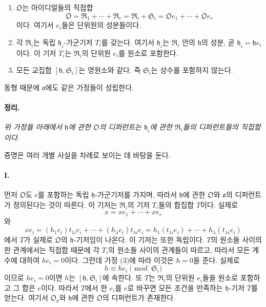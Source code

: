 \begin{enumerate}
\item[(1)] \(\mathfrak O\)는 아이디얼들의 직접합
\[
\mathfrak O=\mathfrak R_1+\cdots+\mathfrak R_r
=\mathfrak R_i+\mathfrak S_i
=\mathfrak Oe_1+\cdots+\mathfrak Oe_r
\]
이다. 여기서 \(e_i\)들은 단위원의 성분들이다.

\item[(2)] 각 \(\mathfrak R_i\)는 독립 \(\mathfrak h_i\)-가군기저 \(T_i\)를 갖는다. 여기서 \(\mathfrak h_i\)는 \(\mathfrak R_i\) 안의 \(\mathfrak h\)의 성분, 곧 \(\mathfrak h_i=\mathfrak h e_i\)이다. 이 기저 \(T_i\)는 \(\mathfrak R_i\)의 단위원 \(e_i\)를 원소로 포함한다.

\item[(3)] 모든 교집합 \([\mathfrak h,\mathfrak S_i]\)는 영원소와 같다. 즉 \(\mathfrak S_i\)는 상수를 포함하지 않는다.
\end{enumerate}

동형 때문에 \(\mathfrak o\)에도 같은 가정들이 성립한다.

\paragraph{정리.}
\emph{위 가정들 아래에서 \(\mathfrak h\)에 관한 \(\mathfrak O\)의 디퍼런트는 \(\mathfrak h_i\)에 관한 \(\mathfrak R_i\)들의 디퍼런트들의 직접합이다.}

증명은 여러 개별 사실을 차례로 보이는 데 바탕을 둔다.

\paragraph{I.}
먼저 \(\mathfrak O\)도 \(e\)를 포함하는 독립 \(\mathfrak h\)-가군기저를 가지며, 따라서 \(\mathfrak h\)에 관한 \(\mathfrak O\)와 \(\mathfrak o\)의 디퍼런트가 정의된다는 것이 따른다. 이 기저는 \(\mathfrak R_i\)의 기저 \(T_i\)들의 합집합 \(T\)이다. 실제로
\[
x=xe_1+\cdots+xe_r
\]
와
\[
xe_i=(h_1e_i)t_{1i}e_i+\cdots+(h_\lambda e_i)t_{\lambda i}e_i
=h_1(t_{1i}e_i)+\cdots+h_\lambda(t_{\lambda i}e_i)
\]
에서 \(T\)가 실제로 \(\mathfrak O\)의 \(\mathfrak h\)-기저임이 나온다. 이 기저는 또한 독립이다. \(T\)의 원소들 사이의 한 관계에서는 직접합 때문에 각 \(T_i\)의 원소들 사이의 관계들이 따르고, 따라서 모든 계수에 대하여 \(he_i=0\)이다. 그런데 가정 (3)에 따라 이것은 \(h=0\)을 준다. 실제로
\[
h\equiv he_i\pmod{\mathfrak S_i}
\]
이므로 \(he_i=0\)이면 \(h\)는 \([\mathfrak h,\mathfrak S_i]\)에 속한다. 또 \(T\)는 \(\mathfrak R_i\)의 단위원 \(e_i\)들을 원소로 포함하고 그 합은 \(e\)이다. 따라서 \(T\)에서 한 \(e_i\)를 \(e\)로 바꾸면 모든 조건을 만족하는 \(\mathfrak h\)-기저 \(\overline T\)를 얻는다. 여기서 \(\mathfrak O_{\mathfrak o}\)와 \(\mathfrak h\)에 관한 \(\mathfrak O\)의 디퍼런트가 존재한다.

